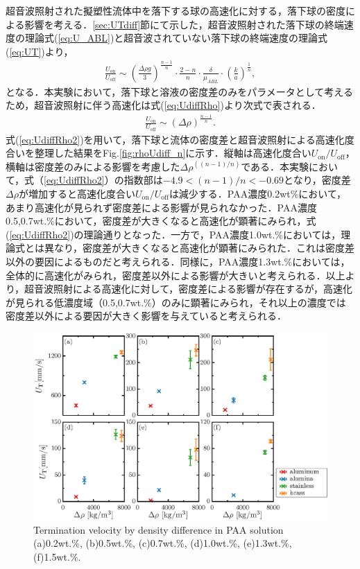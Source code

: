 超音波照射された擬塑性流体中を落下する球の高速化に対する，落下球の密度による影響を考える．\ref{sec:UTdiff}節にて示した，超音波照射された落下球の終端速度の理論式(\ref{eq:U_ABL})と超音波されていない落下球の終端速度の理論式(\ref{eq:UT})より，
\begin{eqnarray}
    \frac{U_\text{on}}{U_\text{off}} \sim \left(\frac{\Delta\rho{}g}{3}\right)^{\frac{n-1}{n}}\cdot\frac{2-n}{n}\cdot\frac{\delta}{\mu_{ABL}}\cdot\left(\frac{k}{a}\right)^{\frac{1}{n}} ,
    \label{eq:UdiffRho}
\end{eqnarray}
となる．本実験において，落下球と溶液の密度差のみをパラメータとして考えるため，超音波照射に伴う高速化は式(\ref{eq:UdiffRho})より次式で表される．
\begin{eqnarray}
    \frac{U_\text{on}}{U_\text{off}} \sim \left(\Delta\rho{}\right)^{\frac{n-1}{n}} .
    \label{eq:UdiffRho2}
\end{eqnarray}
式(\ref{eq:UdiffRho2})を用いて，落下球と流体の密度差と超音波照射による高速化度合いを整理した結果をFig.\ref{fig:rhoUdiff_n}に示す．縦軸は高速化度合い$U_\text{on}/U_\text{off}$，横軸は密度差のみによる影響を考慮した$\Delta\rho^{\left(\left(n-1\right)/n\right)}$である．本実験において，式（\ref{eq:UdiffRho2}）の指数部は$-4.9<(n-1)/n<-0.69$となり，密度差$\Delta\rho$が増加すると高速化度合い$U_\text{on}/U_\text{off}$は減少する．PAA濃度0.2wt\%において，あまり高速化が見られず密度差による影響が見られなかった．PAA濃度0.5,0.7wt.\%において，密度差が大きくなると高速化が顕著にみられ，式(\ref{eq:UdiffRho2})の理論通りとなった．一方で，PAA濃度1.0wt.\%においては，理論式とは異なり，密度差が大きくなると高速化が顕著にみられた．これは密度差以外の要因によるものだと考えられる．同様に，PAA濃度1.3wt.\%においては，全体的に高速化がみられ，密度差以外による影響が大きいと考えられる．以上より，超音波照射による高速化に対して，密度差による影響が存在するが，高速化が見られる低濃度域（0.5,0.7wt.\%）のみに顕著にみられ，それ以上の濃度では密度差以外による要因が大きく影響を与えていると考えられる．

\begin{figure}[ht]
    \centering
    \includegraphics[width=1.0\textwidth]{./5-Results/rhoUT.eps}
    \caption{Termination velocity by density difference in PAA solution (a)0.2wt.\%, (b)0.5wt.\%, (c)0.7wt.\%, (d)1.0wt.\%, (e)1.3wt.\%, (f)1.5wt.\%.}
    \label{fig:rhoUT}
\end{figure}

